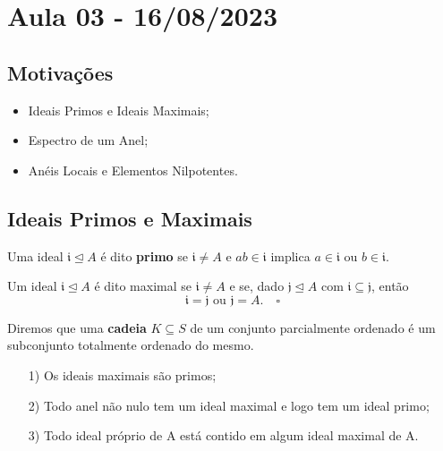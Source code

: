 \documentclass[AlgebraII/algebraII_notes.tex]{subfiles}
\begin{document}
\section{Aula 03 - 16/08/2023}
\subsection{Motivações}
\begin{itemize}
	\item Ideais Primos e Ideais Maximais;
	\item Espectro de um Anel;
	\item Anéis Locais e Elementos Nilpotentes.
\end{itemize}
\subsection{Ideais Primos e  Maximais}
\begin{def*}
	Uma ideal \(\mathfrak{i} \trianglelefteq{A}\) é dito \textbf{primo} se \(\mathfrak{i}\neq A\) e \(ab\in \mathfrak{i}\)
	implica \(a\in \mathfrak{i}\) ou \(b\in \mathfrak{i}.\)

	Um ideal \(\mathfrak{i}\trianglelefteq{A}\) é dito maximal se \(\mathfrak{i}\neq A\) e se, dado \(\mathfrak{j}\trianglelefteq{A}\)
	com \(\mathfrak{i}\subseteq{\mathfrak{j}}\), então
	\[
		\mathfrak{i} = \mathfrak{j}\text{ ou } \mathfrak{j} = A.\quad\square
	\]
\end{def*}
Diremos que uma \textbf{cadeia} \(K\subseteq{S}\) de um conjunto parcialmente ordenado é um subconjunto totalmente
ordenado do mesmo.
\begin{prop*}
	\begin{itemize}
		\item[1)] Os ideais maximais são primos;
		\item[2)] Todo anel não nulo tem um ideal maximal e logo tem um ideal primo;
		\item[3)] Todo ideal próprio de A está contido em algum ideal maximal de A.
	\end{itemize}
\end{prop*}
\end{document}
